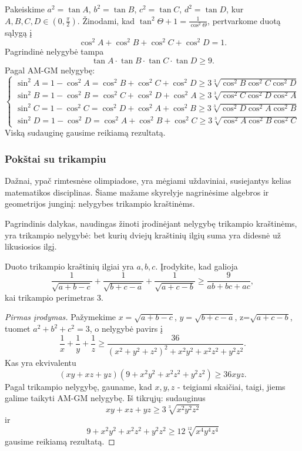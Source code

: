 \begin{sprendimas}
  Pakeiskime $a^2=\tan A$, $b^2=\tan B$, $c^2=\tan C$, $d^2= \tan D$, kur
  $A,B,C,D\in(0,\frac{\pi}{2}).$ Žinodami, kad
  $\tan^2\Theta+1=\frac{1}{\cos^2\Theta}$, pertvarkome duotą sąlygą į
  $$\cos^2A+\cos^2B+\cos^2C+\cos^2D=1.$$ Pagrindinė nelygybė tampa $$\tan
  A\cdot\tan B\cdot\tan C\cdot\tan D\geq9.$$ Pagal AM-GM nelygybę:
  $$\left\{
  \begin{array}{ll}
    \sin^2A=1-\cos^2A=\cos^2B+\cos^2C+\cos^2D\geq3\sqrt[3]{\cos^2B\cos^2C\cos^2D}\\
    \sin^2B=1-\cos^2B=\cos^2C+\cos^2D+\cos^2A\geq3\sqrt[3]{\cos^2C\cos^2D\cos^2A}\\
    \sin^2C=1-\cos^2C=\cos^2D+\cos^2A+\cos^2B\geq3\sqrt[3]{\cos^2D\cos^2A\cos^2B}\\
    \sin^2D=1-\cos^2D=\cos^2A+\cos^2B+\cos^2C\geq3\sqrt[3]{\cos^2A\cos^2B\cos^2C}
  \end{array}
  \right.$$
  Viską sudauginę gausime reikiamą rezultatą.
\end{sprendimas}

\subsubsection{Pokštai su trikampiu}

Dažnai, ypač rimtesnėse olimpiadose, yra mėgiami uždaviniai, susiejantys
kelias matematikos disciplinas. Šiame mažame skyrelyje nagrinėsime algebros
ir geometrijos junginį: nelygybes trikampio kraštinėms.

Pagrindinis dalykas, naudingas žinoti įrodinėjant nelygybę trikampio
kraštinėms, yra trikampio nelygybė: bet kurių dviejų kraštinių ilgių suma
yra didesnė už likusiosios ilgį.

\begin{pavnr}
  Duoto trikampio kraštinių ilgiai yra $a,b,c$. Įrodykite, kad galioja
  $$\frac{1}{\sqrt{a+b-c}}+\frac{1}{\sqrt{b+c-a}}+\frac{1}{\sqrt{a+c-b}}\geq\frac{9}{ab+bc+ac},$$
  kai trikampio perimetras 3.
\end{pavnr}

\begin{proof}[Pirmas įrodymas]
  Pažymekime $x=\sqrt{a+b-c}$, $y=\sqrt{b+c-a}$, z=$\sqrt{a+c-b}$, tuomet
  $a^2+b^2+c^2=3$, o nelygybė pavirs į
  \begin{equation*}\frac{1}{x}+\frac{1}{y}+\frac{1}{z}\geq\frac{36}{(x^2+y^2+z^2)^2+x^2y^2+x^2z^2+y^2z^2}.
    \tag{Įsitikinkite!}
  \end{equation*} Kas yra ekvivalentu
  $$(xy+xz+yz)(9+x^2y^2+x^2z^2+y^2z^2)\geq36xyz.$$ Pagal trikampio
  nelygybę, gauname, kad $x,y,z$ - teigiami skaičiai, taigi, jiems galime
  taikyti AM-GM nelygybę. Iš tikrųjų: sudauginus
  $$xy+xz+yz\geq3\sqrt[3]{x^2y^2z^2}$$ ir
  $$9+x^2y^2+x^2z^2+y^2z^2\geq12\sqrt[12]{x^4y^4z^4}$$ gausime reikiamą
  rezultatą.
\end{proof}

